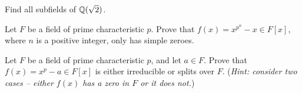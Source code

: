 \begin{problem}
    Find all subfields of $\mathbb{Q}(\sqrt2)$.
\end{problem}

\begin{problem}\label{problem-(x^p^n-x)-only-has-simple-zeroes}
    Let $F$ be a field of prime characteristic $p$. Prove that $f(x) = x^{p^n} - x \in F[x]$, where $n$ is a positive integer, only has simple zeroes.
\end{problem}

\begin{problem}
    Let $F$ be a field of prime characteristic $p$, and let $a \in F$. Prove that $f(x) = x^p - a \in F[x]$ is either irreducible or splits over $F$.\newline
    (\textit{Hint: consider two cases -- either $f(x)$ has a zero in $F$ or it does not.})
\end{problem}
